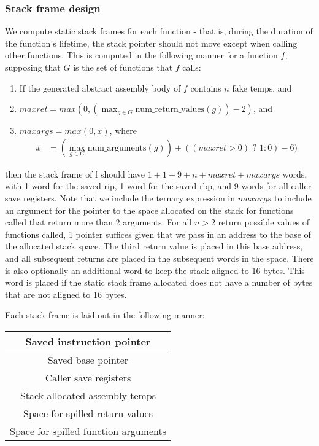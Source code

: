 \documentclass{hw}
\begin{document}
\subsubsection{Stack frame design}
We compute static stack frames for each function - that is, during the
duration of the function's lifetime, the stack pointer should not
move except when calling other functions. This is computed in the
following manner for a function $f$, supposing that $G$ is the set of functions
that $f$ calls:
  \begin{enumerate}
    \item If the generated abstract assembly body of $f$ contains $n$ fake temps, and
    \item $maxret = max(0, (\max_{g\in G} \text{num\_return\_values}(g)) - 2)$, and
    \item $maxargs = max(0, x)$, where
        \begin{align*}
          x &= (\max_{g\in G} \text{num\_arguments}(g)) + ((maxret > 0) \text{ ? } 1 : 0) - 6)
        \end{align*}
  \end{enumerate}
then the stack frame of f should have $1 + 1 + 9 + n + maxret + maxargs$ words,
with 1 word for the saved rip, 1 word for the saved rbp, and 9 words for all
caller save registers. Note that we include the ternary expression in $maxargs$
to include an argument for the pointer to the space allocated on the stack for
functions called that return more than $2$ arguments. For all $n>2$ return possible
values of functions called, 1 pointer suffices given that we pass in an address to
the base of the allocated stack space. The third return value is placed in this base
address, and all subsequent returns are placed in the subsequent words in the space.
There is also optionally an additional word to keep the stack aligned to 16 bytes.
This word is placed if the static stack frame allocated does not have a number of bytes
that are not aligned to 16 bytes.

Each stack frame is laid out in the following manner:

\begin{center}
  \begin{tabular}{|c|}
    \hline
    Saved instruction pointer \\
    \hline
    Saved base pointer \\
    \hline
    Caller save registers \\
    \hline
    Stack-allocated assembly temps \\
    \hline
    Space for spilled return values \\
    \hline
    Space for spilled function arguments \\
    \hline
  \end{tabular}
\end{center}
\end{document}
